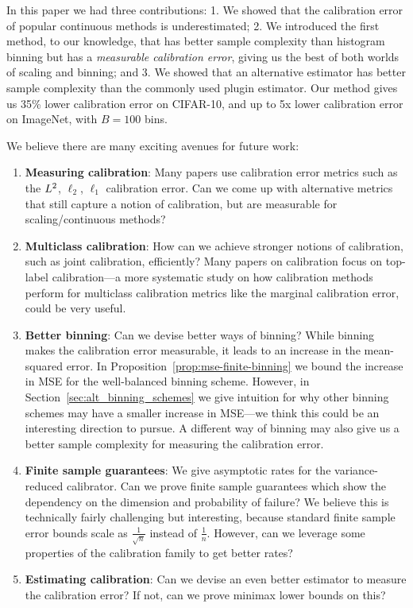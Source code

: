 In this paper we had three contributions: 1. We showed that the calibration error of popular continuous methods is underestimated; 2. We introduced the first method, to our knowledge, that has better sample complexity than histogram binning but has a \emph{measurable calibration error}, giving us the best of both worlds of scaling and binning; and 3. We showed that an alternative estimator has better sample complexity than the commonly used plugin estimator. Our method gives us 35\% lower calibration error on CIFAR-10, and up to 5x lower calibration error on ImageNet, with $B = 100$ bins.

We believe there are many exciting avenues for future work:
\begin{enumerate}
\item \textbf{Measuring calibration}: Many papers use calibration error metrics such as the $L^2$, $\ell_2$, $\ell_1$ calibration error. Can we come up with alternative metrics that still capture a notion of calibration, but are measurable for scaling/continuous methods?
\item \textbf{Multiclass calibration}: How can we achieve stronger notions of calibration, such as joint calibration, efficiently? Many papers on calibration focus on top-label calibration---a more systematic study on how calibration methods perform for multiclass calibration metrics like the marginal calibration error, could be very useful.
\item \textbf{Better binning}: Can we devise better ways of binning? While binning makes the calibration error measurable, it leads to an increase in the mean-squared error. In Proposition~\ref{prop:mse-finite-binning} we bound the increase in MSE for the well-balanced binning scheme. However, in Section~\ref{sec:alt_binning_schemes} we give intuition for why other binning schemes may have a smaller increase in MSE---we think this could be an interesting direction to pursue. A different way of binning may also give us a better sample complexity for measuring the calibration error.
\item \textbf{Finite sample guarantees}: We give asymptotic rates for the variance-reduced calibrator. Can we prove finite sample guarantees which show the dependency on the dimension and probability of failure? We believe this is technically fairly challenging but interesting, because standard finite sample error bounds scale as $\frac{1}{\sqrt{n}}$ instead of $\frac{1}{n}$. However, can we leverage some properties of the calibration family to get better rates?
\item \textbf{Estimating calibration}: Can we devise an even better estimator to measure the calibration error? If not, can we prove minimax lower bounds on this?
\end{enumerate}

